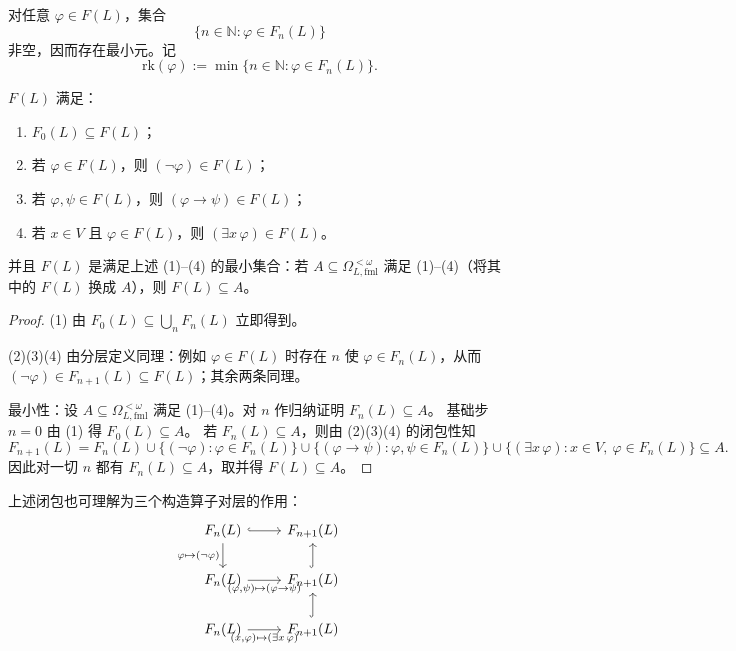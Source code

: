\documentclass[lang=cn,a4paper,newtx,section]{elegantbook}
\begin{document}
 \begin{lemma}[层级（公式复杂度）]
 对任意 $\varphi\in F(L)$，集合
 \[
   \{n\in\mathbb N: \varphi\in F_n(L)\}
 \]
 非空，因而存在最小元。记
 \[
   \mathrm{rk}(\varphi):=\min\{n\in\mathbb N: \varphi\in F_n(L)\}.
 \]
 \end{lemma}
 
 \begin{proposition}
 $F(L)$ 满足：
 \begin{enumerate}
   \item $F_0(L)\subseteq F(L)$；
   \item 若 $\varphi\in F(L)$，则 $(\neg\varphi)\in F(L)$；
   \item 若 $\varphi,\psi\in F(L)$，则 $(\varphi\to\psi)\in F(L)$；
   \item 若 $x\in V$ 且 $\varphi\in F(L)$，则 $(\exists x\,\varphi)\in F(L)$。
 \end{enumerate}
 并且 $F(L)$ 是满足上述 (1)--(4) 的最小集合：若 $A\subseteq \Omega_{L,\mathrm{fml}}^{<\omega}$ 满足 (1)--(4)（将其中的 $F(L)$ 换成 $A$），则 $F(L)\subseteq A$。
 \end{proposition}
 
 \begin{proof}
 (1) 由 $F_0(L)\subseteq\bigcup_n F_n(L)$ 立即得到。
 
 (2)(3)(4) 由分层定义同理：例如 $\varphi\in F(L)$ 时存在 $n$ 使 $\varphi\in F_n(L)$，从而 $(\neg\varphi)\in F_{n+1}(L)\subseteq F(L)$；其余两条同理。
 
 最小性：设 $A\subseteq\Omega_{L,\mathrm{fml}}^{<\omega}$ 满足 (1)--(4)。对 $n$ 作归纳证明 $F_n(L)\subseteq A$。
 基础步 $n=0$ 由 (1) 得 $F_0(L)\subseteq A$。
 若 $F_n(L)\subseteq A$，则由 (2)(3)(4) 的闭包性知
 \[
   F_{n+1}(L)=F_n(L)\cup\{(\neg\varphi):\varphi\in F_n(L)\}\cup\{(\varphi\to\psi):\varphi,\psi\in F_n(L)\}\cup\{(\exists x\,\varphi): x\in V,\ \varphi\in F_n(L)\}\subseteq A.
 \]
 因此对一切 $n$ 都有 $F_n(L)\subseteq A$，取并得 $F(L)\subseteq A$。
 \end{proof}
 
 \begin{remark}
 上述闭包也可理解为三个构造算子对层的作用：
 \[
 \begin{tikzcd}
 F_n(L) \arrow[r, hook] \arrow[d, "{\varphi\mapsto(\neg\varphi)}"'] & F_{n+1}(L) \\
 F_n(L) \arrow[r, "{(\varphi,\psi)\mapsto(\varphi\to\psi)}"'] & F_{n+1}(L) \arrow[u, hook] \\
 F_n(L) \arrow[r, "{(x,\varphi)\mapsto(\exists x\,\varphi)}"'] & F_{n+1}(L) \arrow[u, hook]
 \end{tikzcd}
 \]
 \end{remark}
 
\end{document}
